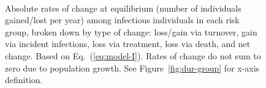 \begin{figure}
\begin{minipage}[t]{0.475\linewidth}
\begin{subfigure}{0.85\linewidth}
    \label{fig:dX-I-low}
  \end{subfigure}\\
  \caption{Absolute rates of change at equilibrium
    (number of individuals gained/lost per year)
    among infectious individuals in each risk group,
    broken down by type of change:
    loss/gain via turnover, %
    gain via incident infections, %
    loss via treatment, %
    loss via death, %
    and net change.
    Based on Eq.~(\ref{eq:model-I}).
    Rates of change do not sum to zero due to population growth.
    See Figure~\ref{fig:dur-group} for x-axis definition.}
  \label{fig:dX-I}
\end{minipage}
\end{figure}
